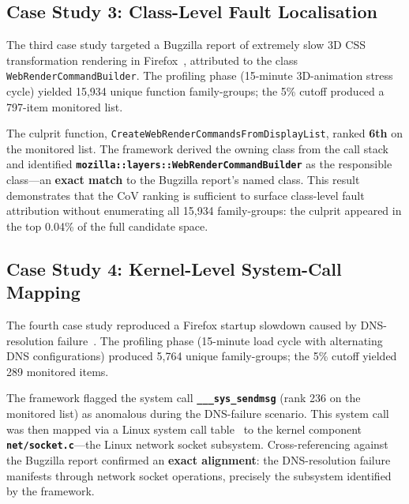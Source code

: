 \documentclass[a4paper,fleqn]{cas-sc}
\theoremstyle{plain}
\begin{document}
\subsection{Case Study 3: Class-Level Fault Localisation}\label{sec:cs3}

The third case study targeted a Bugzilla report of extremely slow 3D CSS
transformation rendering in Firefox~\cite{muizelaar-2020}, attributed to the
class \texttt{WebRenderCommandBuilder}.
The profiling phase (15-minute 3D-animation stress cycle) yielded 15,934 unique
function family-groups; the 5\% cutoff produced a 797-item monitored list.

The culprit function, \texttt{CreateWebRenderCommandsFromDisplayList},
ranked \textbf{6th} on the monitored list.
The framework derived the owning class from the call stack and identified
\textbf{\texttt{mozilla::layers::WebRenderCommandBuilder}} as the responsible
class---an \textbf{exact match} to the Bugzilla report's named class.
This result demonstrates that the CoV ranking is sufficient to surface
class-level fault attribution without enumerating all 15,934 family-groups:
the culprit appeared in the top 0.04\% of the full candidate space.

\subsection{Case Study 4: Kernel-Level System-Call Mapping}\label{sec:cs4}

The fourth case study reproduced a Firefox startup slowdown caused by
DNS-resolution failure~\cite{cook-2022}.
The profiling phase (15-minute load cycle with alternating DNS configurations)
produced 5,764 unique family-groups; the 5\% cutoff yielded 289 monitored items.

The framework flagged the system call \textbf{\texttt{\_\_\_sys\_sendmsg}}
(rank 236 on the monitored list) as anomalous during the DNS-failure scenario.
This system call was then mapped via a Linux system call
table~\cite{valsorda-no-date} to the kernel component
\textbf{\texttt{net/socket.c}}---the Linux network socket subsystem.
Cross-referencing against the Bugzilla report confirmed an \textbf{exact
alignment}: the DNS-resolution failure manifests through network socket
operations, precisely the subsystem identified by the framework.
\end{document}
